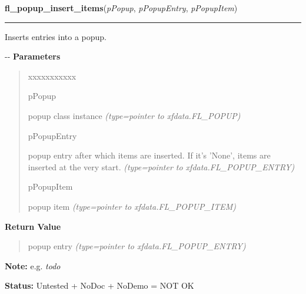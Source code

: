     \label{xformslib:flpopup:fl_popup_insert_items}

    \vspace{0.5ex}

\hspace{.8\funcindent}\begin{boxedminipage}{\funcwidth}

    \raggedright \textbf{fl\_popup\_insert\_items}(\textit{pPopup}, \textit{pPopupEntry}, \textit{pPopupItem})

    \vspace{-1.5ex}

    \rule{\textwidth}{0.5\fboxrule}
\setlength{\parskip}{2ex}

Inserts entries into a popup.

-{}-
\setlength{\parskip}{1ex}
      \textbf{Parameters}
      \vspace{-1ex}

      \begin{quote}
        \begin{Ventry}{xxxxxxxxxxx}

          \item[pPopup]


popup class instance
            {\it (type=pointer to xfdata.FL\_POPUP)}

          \item[pPopupEntry]


popup entry after which items are inserted. If it's 'None', items are
inserted at the very start.
            {\it (type=pointer to xfdata.FL\_POPUP\_ENTRY)}

          \item[pPopupItem]


popup item
            {\it (type=pointer to xfdata.FL\_POPUP\_ITEM)}

        \end{Ventry}

      \end{quote}

      \textbf{Return Value}
    \vspace{-1ex}

      \begin{quote}

popup entry
      {\it (type=pointer to xfdata.FL\_POPUP\_ENTRY)}

      \end{quote}

\textbf{Note:} 
e.g. \emph{todo}


\textbf{Status:} 
Untested + NoDoc + NoDemo = NOT OK


    \end{boxedminipage}

